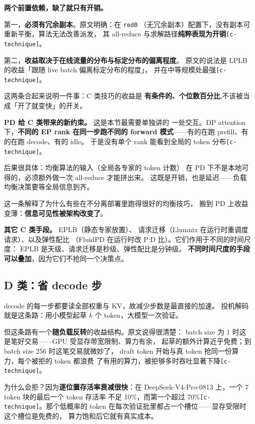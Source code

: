 \noindent\textbf{两个前置依赖，缺了就只有开销。}

第一，\textbf{必须有冗余副本}。原文明确：在 \texttt{red0}
（无冗余副本）配置下，没有副本可重新平衡，算法无法改善派发，
其 all-reduce 与求解路径\textbf{纯粹表现为开销}\texttt{[c-technique]}。

第二，\textbf{收益取决于在线流量的分布与标定分布的偏离程度}。
原文的说法是 LPLB 的收益「跟随 live batch 偏离标定分布的程度」，
并在中等规模处最强\texttt{[c-technique]}。

\noindent 这两条合起来说明一件事：C 类技巧的收益是
\textbf{有条件的、个位数百分比},不该被当成「开了就变快」的开关。

\noindent\textbf{PD 给 C 类带来的新约束。} 这是本节最需要单独讲的
一处交互。DP attention 下，\textbf{不同的 EP rank 在同一步跑不同的
forward 模式}——有的在跑 prefill、有的在跑 decode、有的 idle。
于是没有单个 rank 能看到全局的 token 分布\texttt{[c-technique]}。

\noindent 后果很具体：均衡算法的输入（全局各专家的 token 计数）
在 PD 下不是本地可得的，必须额外做一次 all-reduce 才能拼出来。
这既是开销，也是延迟——负载均衡决策要等全局信息到齐。

\noindent 这一条解释了为什么有些在不分离部署里跑得很好的均衡技巧，
搬到 PD 上收益变薄：\textbf{信息可见性被架构改变了}。

\noindent\textbf{其它 C 类手段。} EPLB（静态专家放置）、
请求迁移（Llumnix 在运行时重调度请求）、以及弹性配比
（FluidPD 在运行时改 P:D 比）。它们作用于不同的时间尺度：
EPLB 是天级、请求迁移是秒级、弹性配比是分钟级。
\textbf{不同时间尺度的手段可以叠加}，因为它们不抢同一个决策点。

\subsection{D 类：省 decode 步}

decode 的每一步都要读全部权重与 KV，故减少步数是最直接的加速。
投机解码就是这条路：用小模型起草 $k$ 个 token，大模型一次验证。

\noindent 但这条路有一个\textbf{随负载反转}的收益结构。原文说得很清楚：
batch size 为 1 时这是笔好交易——GPU 受显存带宽限制、算力有余，
起草的额外计算近乎免费；到 batch size 256 时这笔交易就微妙了，
draft token 开始与真 token 抢同一份算力，每个被拒的 token 都浪费
了有用的算力，被拒够多时吞吐显著下降\texttt{[c-technique]}。

\noindent 为什么会拒？因为\textbf{逐位置存活率衰减很快}：在
DeepSeek-V4-Pro-0813 上，一个 7 token 块的最后一个 token 存活率
不足 10\%，而第一个超过 70\%\texttt{[c-technique]}。那个低概率的
token 在每次验证批里都占一个槽位——显存受限时这个槽位是免费的，
算力饱和后它就有真实成本。


